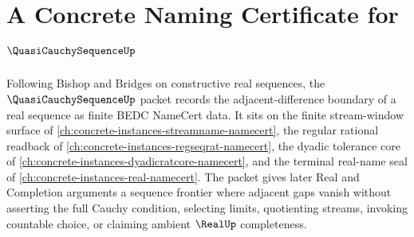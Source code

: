 \chapter{A Concrete Naming Certificate for $\QuasiCauchySequenceUp$}
\label{ch:concrete-instances-quasi-cauchy-sequence-namecert}

Following Bishop and Bridges on constructive real sequences, the $\QuasiCauchySequenceUp$ packet records the adjacent-difference boundary of a real sequence as finite BEDC NameCert data. It sits on the finite stream-window surface of \autoref{ch:concrete-instances-streamname-namecert}, the regular rational readback of \autoref{ch:concrete-instances-regseqrat-namecert}, the dyadic tolerance core of \autoref{ch:concrete-instances-dyadicratcore-namecert}, and the terminal real-name seal of \autoref{ch:concrete-instances-real-namecert}. The packet gives later Real and Completion arguments a sequence frontier where adjacent gaps vanish without asserting the full Cauchy condition, selecting limits, quotienting streams, invoking countable choice, or claiming ambient $\RealUp$ completeness.

